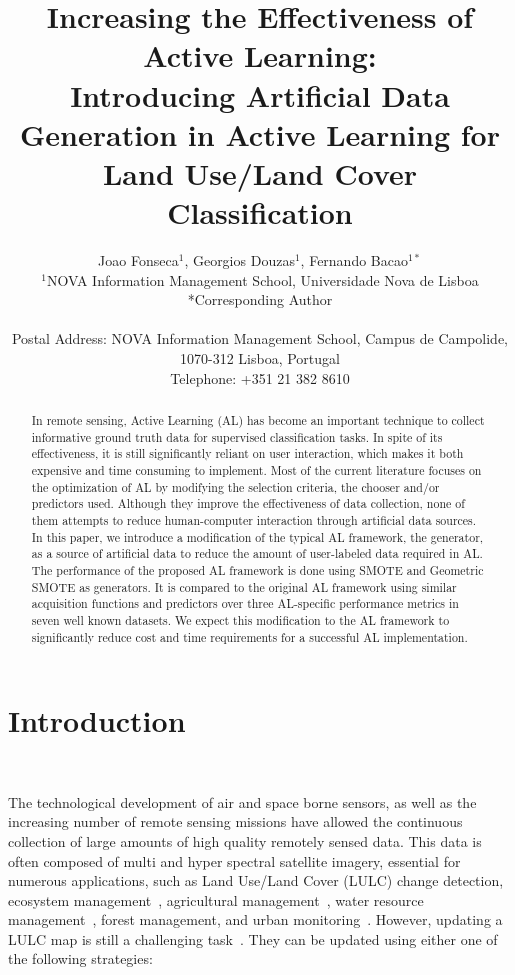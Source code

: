 \documentclass[parskip=full]{scrartcl}
\title{Increasing the Effectiveness of Active Learning:\\ 
	\LARGE{Introducing Artificial Data Generation in Active Learning for Land Use/Land Cover Classification}}
\author{
	Joao Fonseca\(^{1}\), Georgios Douzas\(^{1}\), Fernando Bacao\(^{1*}\) 
	\\
	\small{\(^{1}\)NOVA Information Management School, Universidade Nova de Lisboa}
	\\
	\small{*Corresponding Author}
	\\
	\\
	\small{Postal Address: NOVA Information Management School, Campus de Campolide, 1070-312 Lisboa, Portugal}
	\\
	\small{Telephone: +351 21 382 8610}
}
\date{}
\begin{document}
\maketitle

\begin{abstract}
    In remote sensing, Active Learning (AL) has become an important technique to
    collect informative ground truth data for supervised classification tasks.
    In spite of its effectiveness, it is still significantly reliant on user
    interaction, which makes it both expensive and time consuming to implement.
    Most of the current literature focuses on the optimization of AL by
    modifying the selection criteria, the chooser and/or predictors used.
    Although they improve the effectiveness of data collection, none of them
    attempts to reduce human-computer interaction through artificial data
    sources. In this paper, we introduce a modification of the typical AL
    framework, the generator, as a source of artificial data to reduce the
    amount of user-labeled data required in AL\@. The performance of the
    proposed AL framework is done using SMOTE and Geometric SMOTE as generators.
    It is compared to the original AL framework using similar acquisition
    functions and predictors over three AL-specific performance metrics in seven
    well known datasets. We expect this modification to the AL framework to
    significantly reduce cost and time requirements for a successful AL
    implementation. 
\end{abstract}

\section{Introduction}~\label{sec:introduction}

The technological development of air and space borne sensors, as well as the
increasing number of remote sensing missions have allowed the continuous
collection of large amounts of high quality remotely sensed data. This data is
often composed of multi and hyper spectral satellite imagery, essential for
numerous applications, such as Land Use/Land Cover (LULC) change detection,
ecosystem management~\cite{Nagai2020}, agricultural management~\cite{Huang2018},
water resource management~\cite{Wang2018}, forest management, and urban
monitoring~\cite{Khatami2016}. However, updating a LULC map is still a
challenging task~\cite{Gavade2019, Wulder2018}. They can be updated using either
one of the following strategies:
\end{document}
